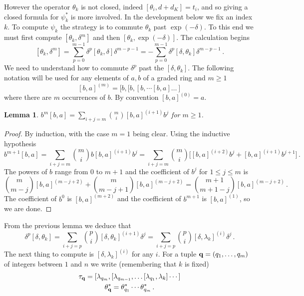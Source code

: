 \documentclass[english,letter paper,12pt,leqno]{article}
\newtheorem{lemma}[theorem]{Lemma}
\theoremstyle{example}
\numberwithin{equation}{section}
\begin{document}
However the operator $\theta_k$ is not closed, indeed $[ \theta_i, d + d_K ] = t_i$, and so giving a closed formula for $\psi_k^*$ is more involved. In the development below we fix an index $k$. To compute $\psi_k$ the strategy is to commute $\theta_k$ past $\exp(-\delta)$. To this end we must first compute $[\theta_k, \delta^m]$ and then $[\theta_k, \exp(-\delta)]$. The calculation begins
\begin{equation}\label{eq:catfish}
[ \theta_k, \delta^m ] = \sum_{p=0}^{m-1} \delta^p [ \theta_k, \delta ] \delta^{m-p-1} = - \sum_{p=0}^{m-1} \delta^p [ \delta, \theta_k ] \delta^{m-p-1}\,.
\end{equation}
We need to understand how to commute $\delta^p$ past the $[ \delta, \theta_k ]$. The following notation will be used for any elements of $a,b$ of a graded ring and $m \ge 1$
\[
[b, a]^{(m)} = [b, [b, [b, \cdots [b, a] \dots ]
\]
where there are $m$ occurrences of $b$. By convention $[b,a]^{(0)} = a$.

\begin{lemma} $b^m [b, a] = \sum_{i+j=m} \binom{m}{i} [b,a]^{(i+1)} b^j$ for $m \ge 1$.
\end{lemma}
\begin{proof}
By induction, with the case $m = 1$ being clear. Using the inductive hypothesis
\[
b^{m+1} [b, a] = \sum_{i+j=m} \binom{m}{i} b [b,a]^{(i+1)} b^j = \sum_{i+j=m} \binom{m}{i} \Big[ [b,a]^{(i+2)} b^j + [b,a]^{(i+1)} b^{j+1} \Big]\,.
\]
The powers of $b$ range from $0$ to $m+1$ and the coefficient of $b^j$ for $1 \le j \le m$ is
\[
\binom{m}{m-j} [b,a]^{(m-j+2)} + \binom{m}{m-j+1} [b,a]^{(m-j+2)} = \binom{m+1}{m+1-j} [b,a]^{(m-j+2)}\,.
\]
The coefficient of $b^0$ is $[b,a]^{(m+2)}$ and the coefficient of $b^{m+1}$ is $[b,a]^{(1)}$, so we are done.
\end{proof}

From the previous lemma we deduce that
\begin{equation}\label{eq:calc1}
\delta^p [ \delta, \theta_k ] = \sum_{i+j=p} \binom{p}{i} [ \delta, \theta_k ]^{(i+1)} \delta^j = \sum_{i+j=p} \binom{p}{i} [ \delta, \lambda_k ]^{(i)} \delta^j\,.
\end{equation}
The next thing to compute is $[ \delta, \lambda_k ]^{(i)}$ for any $i$. For a tuple $\bold{q} = (q_1,\ldots,q_m)$ of integers between $1$ and $n$ we write (remembering that $k$ is fixed)
\begin{gather*}
\tau_{\bold{q}} = [ \lambda_{q_m}, [ \lambda_{q_{m-1}}, \ldots [ \lambda_{q_1}, \lambda_k ] \cdots ]\\
\theta_{\bold{q}}^* = \theta_{q_1}^* \cdots \theta_{q_m}^*\,.
\end{gather*}
\end{document}
